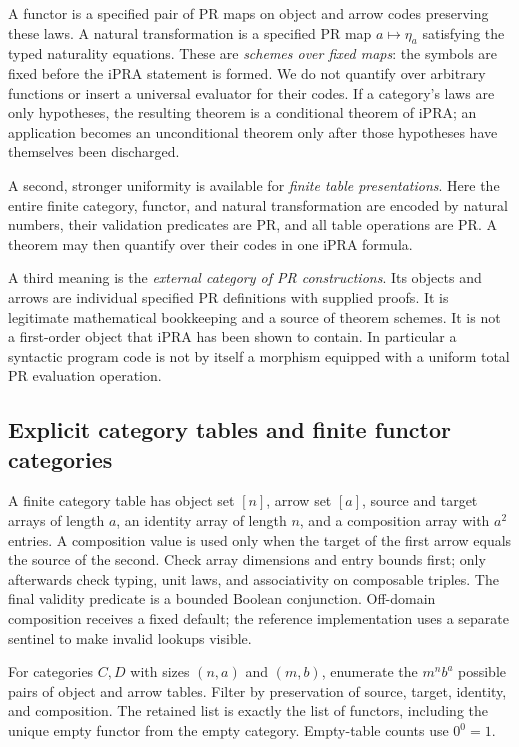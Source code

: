 A functor is a specified pair of PR maps on object and arrow codes preserving
these laws.  A natural transformation is a specified PR map $a\mapsto\eta_a$
satisfying the typed naturality equations.  These are \emph{schemes over fixed
maps}: the symbols are fixed before the iPRA statement is formed.  We do not
quantify over arbitrary functions or insert a universal evaluator for their
codes.  If a category's laws are only hypotheses, the resulting theorem is a
conditional theorem of iPRA; an application becomes an unconditional theorem
only after those hypotheses have themselves been discharged.

A second, stronger uniformity is available for \emph{finite table presentations}.
Here the entire finite category, functor, and natural transformation are encoded
by natural numbers, their validation predicates are PR, and all table operations
are PR.  A theorem may then quantify over their codes in one iPRA formula.

A third meaning is the \emph{external category of PR constructions}.  Its objects
and arrows are individual specified PR definitions with supplied proofs.  It is
legitimate mathematical bookkeeping and a source of theorem schemes.  It is not
a first-order object that iPRA has been shown to contain.  In particular a
syntactic program code is not by itself a morphism equipped with a uniform total
PR evaluation operation.

\subsection{Explicit category tables and finite functor categories}

A finite category table has object set $[n]$, arrow set $[a]$, source and
target arrays of length $a$, an identity array of length $n$, and a composition
array with $a^2$ entries. A composition value is used only when the target of
the first arrow equals the source of the second. Check array dimensions and
entry bounds first; only afterwards check typing, unit laws, and associativity
on composable triples. The final validity predicate is a bounded Boolean
conjunction. Off-domain composition receives a fixed default; the reference
implementation uses a separate sentinel to make invalid lookups visible.

For categories $C,D$ with sizes $(n,a)$ and $(m,b)$, enumerate the
$m^n b^a$ possible pairs of object and arrow tables. Filter by preservation
of source, target, identity, and composition. The retained list is exactly
the list of functors, including the unique empty functor from the empty
category. Empty-table counts use $0^0=1$.

